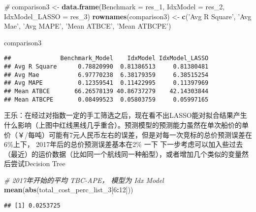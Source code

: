 \documentclass[]{article}
\newenvironment{Shaded}{\begin{snugshade}}{\end{snugshade}}
\newcommand{\KeywordTok}[1]{\textcolor[rgb]{0.13,0.29,0.53}{\textbf{#1}}}
\newcommand{\DataTypeTok}[1]{\textcolor[rgb]{0.13,0.29,0.53}{#1}}
\newcommand{\DecValTok}[1]{\textcolor[rgb]{0.00,0.00,0.81}{#1}}
\newcommand{\StringTok}[1]{\textcolor[rgb]{0.31,0.60,0.02}{#1}}
\newcommand{\CommentTok}[1]{\textcolor[rgb]{0.56,0.35,0.01}{\textit{#1}}}
\newcommand{\OperatorTok}[1]{\textcolor[rgb]{0.81,0.36,0.00}{\textbf{#1}}}
\newcommand{\NormalTok}[1]{#1}
\begin{document}
\begin{Shaded}
\begin{Highlighting}[]
\CommentTok{#              }
\NormalTok{comparison3 <-}\StringTok{ }\KeywordTok{data.frame}\NormalTok{(}\DataTypeTok{Benchmark =}\NormalTok{ res_}\DecValTok{1}\NormalTok{, }\DataTypeTok{IdxModel =}\NormalTok{ res_}\DecValTok{2}\NormalTok{, }\DataTypeTok{IdxModel_LASSO =}\NormalTok{ res_}\DecValTok{3}\NormalTok{)}
\KeywordTok{rownames}\NormalTok{(comparison3) <-}\StringTok{ }\KeywordTok{c}\NormalTok{(}\StringTok{'Avg R Square'}\NormalTok{, }\StringTok{'Avg Mae'}\NormalTok{, }\StringTok{'Avg MAPE'}\NormalTok{, }\StringTok{'Mean ATBCE'}\NormalTok{, }\StringTok{'Mean ATBCPE'}\NormalTok{)}
\end{Highlighting}
\end{Shaded}

\begin{Shaded}
\begin{Highlighting}[]
\NormalTok{comparison3}
\end{Highlighting}
\end{Shaded}

\begin{verbatim}
##              Benchmark_Model    IdxModel IdxModel_LASSO
## Avg R Square      0.78820990  0.81386513     0.81380481
## Avg Mae           6.97770238  6.38179359     6.38515254
## Avg MAPE          0.12359541  0.11422995     0.11397969
## Mean ATBCE       66.26578139 40.86737279    42.14303844
## Mean ATBCPE       0.08499523  0.05803759     0.05997165
\end{verbatim}

王乐：在经过对指数一定的手工筛选之后，现在看不出LASSO能对拟合结果产生什么影响（上图中红线黑线几乎重合）。预测模型的预测能力虽然在单次船价的单价（￥/每吨）可能有7元人民币左右的误差，但是对每一次竞标的总价预测误差在6\%上下，
2017年后的总价预测误差基本在2\% 一下
下一步考虑可以加入些过去（最近）的运价数据（比如同一个航线同一种船型），或者增加几个类似的变量然后尝试Decision
Tree

\begin{Shaded}
\begin{Highlighting}[]
\CommentTok{# 2017年开始的平均 TBC-APE， 模型为 Idx Model }
\KeywordTok{mean}\NormalTok{(}\KeywordTok{abs}\NormalTok{(total_cost_perc_list_}\DecValTok{3}\NormalTok{[}\DecValTok{6}\OperatorTok{:}\DecValTok{12}\NormalTok{]))}
\end{Highlighting}
\end{Shaded}

\begin{verbatim}
## [1] 0.0253725
\end{verbatim}
\end{document}
